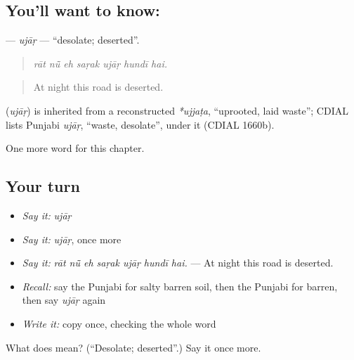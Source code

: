 \subsection*{You'll want to know: }
\textbf{} — \emph{ujāṛ} — \textquotedblleft{}desolate; deserted\textquotedblright{}.

\begin{quote}
      
\end{quote}

\begin{quote}
\emph{rāt nū̃ eh saṛak ujāṛ hundī hai.}
\end{quote}

\begin{quote}
At night this road is deserted.
\end{quote}

\begin{cousinweb}
\textbf{} (\emph{ujāṛ}) is inherited from a reconstructed \emph{*ujjaṭa}, \textquotedblleft{}uprooted, laid waste\textquotedblright{}; CDIAL lists Punjabi \emph{ujāṛ}, \textquotedblleft{}waste, desolate\textquotedblright{}, under it (CDIAL 1660b).
\end{cousinweb}

\begin{grammarlens}[title={What you've built}]
One more word for this chapter.
\end{grammarlens}

\subsection*{Your turn}
\begin{itemize}
\raggedright
  \item \emph{Say it:} \emph{ujāṛ}
  \item \emph{Say it:} \emph{ujāṛ}, once more
  \item \emph{Say it:} \emph{rāt nū̃ eh saṛak ujāṛ hundī hai.} — At night this road is deserted.
  \item \emph{Recall:} say the Punjabi for salty barren soil, then the Punjabi for barren, then say \emph{ujāṛ} again
  \item \emph{Write it:} copy \textbf{} once, checking the whole word
\end{itemize}

\begin{tcolorbox}[breakable,colback=teal!4,colframe=teal!35!black,title={Before you move on}]
What does  mean? (\textquotedblleft{}Desolate; deserted\textquotedblright{}.) Say it once more.
\end{tcolorbox}
